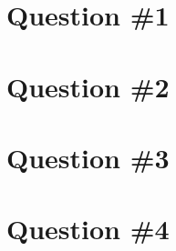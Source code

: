 \documentclass[11pt]{article}
\author{\me}
\title{\assignment}
\newcommand{\problemSection}[1]{
  \section*{Question \##1}
   \newpage
}
\begin{document}
\setlength{\parskip}{.1 in}

\maketitle
\newpage

\problemSection{1}
\problemSection{2}
\problemSection{3}
\problemSection{4}
\end{document}
